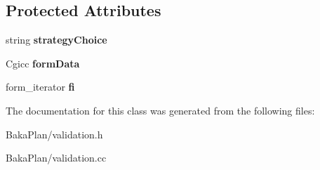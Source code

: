 \subsection*{Protected Attributes}
\begin{DoxyCompactItemize}
\item 
\hypertarget{classValidation_a1313f03a0092ea1d882a60fecaa58e67}{string {\bfseries strategy\-Choice}}\label{classValidation_a1313f03a0092ea1d882a60fecaa58e67}

\item 
\hypertarget{classValidation_a4224a467d43a9df314a78ee22061d8d6}{Cgicc {\bfseries form\-Data}}\label{classValidation_a4224a467d43a9df314a78ee22061d8d6}

\item 
\hypertarget{classValidation_abc319ff9dba2f9d78f68a825c345d093}{form\-\_\-iterator {\bfseries fi}}\label{classValidation_abc319ff9dba2f9d78f68a825c345d093}

\end{DoxyCompactItemize}


The documentation for this class was generated from the following files\-:\begin{DoxyCompactItemize}
\item 
Baka\-Plan/validation.\-h\item 
Baka\-Plan/validation.\-cc\end{DoxyCompactItemize}
